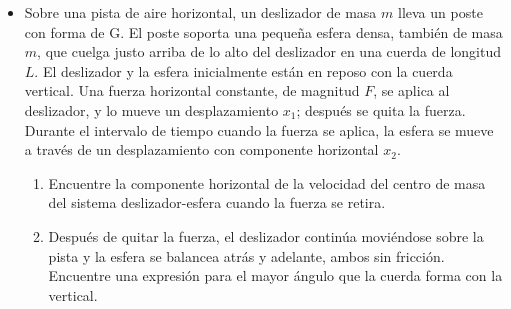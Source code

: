 \documentclass[11pt,a4paper]{article}
\begin{document}
\begin{itemize}
    \item[\textbf{54.}] Sobre una pista de aire horizontal, un deslizador de masa \(m\) lleva un poste con forma de G. El poste soporta una pequeña esfera densa, también de masa \(m\), que cuelga justo arriba de lo alto del deslizador en una cuerda de longitud \(L\). El deslizador y la esfera inicialmente están en reposo con la cuerda vertical. Una fuerza horizontal constante, de magnitud \(F\), se aplica al deslizador, y lo mueve un desplazamiento \(x_1\); después se quita la fuerza. Durante el intervalo de tiempo cuando la fuerza se aplica, la esfera se mueve a través de un desplazamiento con componente horizontal \(x_2\).
    \begin{enumerate}
        \item Encuentre la componente horizontal de la velocidad del centro de masa del sistema deslizador-esfera cuando la fuerza se retira.
        \item Después de quitar la fuerza, el deslizador continúa moviéndose sobre la pista y la esfera se balancea atrás y adelante, ambos sin fricción. Encuentre una expresión para el mayor ángulo que la cuerda forma con la vertical.
    \end{enumerate}
    \vspace*{7cm}
\end{itemize}
\end{document}
